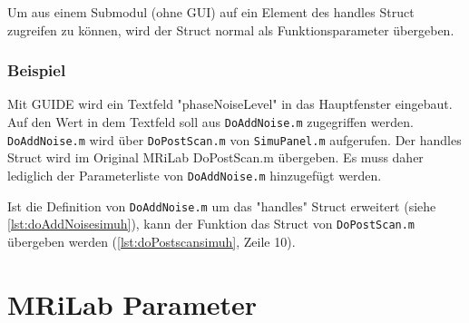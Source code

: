 Um aus einem Submodul (ohne GUI) auf ein Element des handles Struct zugreifen zu können, wird der Struct normal als Funktionsparameter übergeben.

\subsubsection{Beispiel}
Mit GUIDE wird ein Textfeld "phaseNoiseLevel" in das Hauptfenster eingebaut.
Auf den Wert in dem Textfeld soll aus \texttt{DoAddNoise.m} zugegriffen werden. \texttt{DoAddNoise.m} wird über \texttt{DoPostScan.m} von \texttt{SimuPanel.m} aufgerufen. Der handles Struct wird im Original MRiLab DoPostScan.m übergeben. Es muss daher lediglich der Parameterliste von \texttt{DoAddNoise.m} hinzugefügt werden.


Ist die Definition von \texttt{DoAddNoise.m} um das "handles" Struct erweitert (siehe \autoref{lst:doAddNoisesimuh}), kann der Funktion das Struct von \texttt{DoPostScan.m} übergeben werden (\autoref{lst:doPostscansimuh}, Zeile 10).



\clearpage
\section{MRiLab Parameter}

